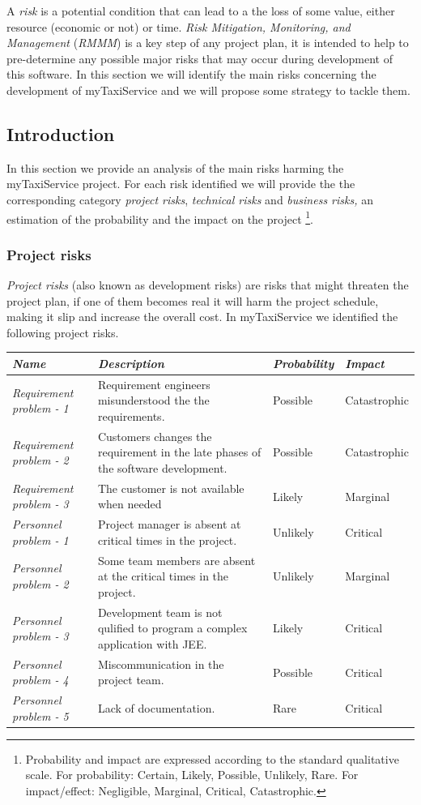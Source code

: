 A \emph{risk }is a potential condition that can lead to a the loss
of some value, either resource (economic or not) or time. \emph{Risk
Mitigation, Monitoring, and Management} (\emph{RMMM}) is a key step
of any project plan, it is intended to help to pre-determine any possible
major risks that may occur during development of this software. In
this section we will identify the main risks concerning the development
of myTaxiService and we will propose some strategy to tackle them.


\subsection{Introduction}

In this section we provide an analysis of the main risks harming the
myTaxiService project. For each risk identified we will provide the
the corresponding category \emph{project risks},\emph{ technical risks
}and\emph{ business risks, }an estimation of the probability and the
impact on the project %
\footnote{Probability and impact are expressed according to the standard qualitative
scale. For probability: Certain, Likely, Possible, Unlikely, Rare.
For impact/effect: Negligible, Marginal, Critical, Catastrophic.%
}.


\subsubsection{Project risks}

\emph{Project risks} (also known as development risks) are risks that
might threaten the project plan, if one of them becomes real it will
harm the project schedule, making it slip and increase the overall
cost. In myTaxiService we identified the following project risks.

\medskip{}


\begin{tabular}{>{\raggedright}p{4cm}|>{\raggedright}p{5cm}|>{\centering}p{2cm}|>{\centering}p{2cm}}
\hline 
\emph{Name} & \emph{Description} & \emph{Probability} & \emph{Impact}\tabularnewline
\hline 
\hline 
\emph{Requirement problem - 1} & Requirement engineers misunderstood the the requirements. & Possible & Catastrophic\tabularnewline
\hline 
\emph{Requirement problem - 2} & Customers changes the requirement in the late phases of the software
development. & Possible & Catastrophic\tabularnewline
\hline 
\emph{Requirement problem - 3} & The customer is not available when needed & Likely & Marginal\tabularnewline
\hline 
\emph{Personnel problem - 1} & Project manager is absent at critical times in the project. & Unlikely & Critical\tabularnewline
\hline 
\emph{Personnel problem - 2} & Some team members are absent at the critical times in the project. & Unlikely & Marginal\tabularnewline
\hline 
\emph{Personnel problem - 3} & Development team is not qulified to program a complex application
with JEE. & Likely & Critical\tabularnewline
\hline 
\emph{Personnel problem - 4} & Miscommunication in the project team. & Possible & Critical\tabularnewline
\hline 
\emph{Personnel problem - 5} & Lack of documentation. & Rare & Critical\tabularnewline
\hline 
\end{tabular}


